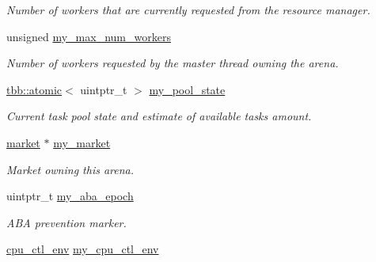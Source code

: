 \begin{DoxyCompactItemize}
\begin{DoxyCompactList}\small\item\em Number of workers that are currently requested from the resource manager. \end{DoxyCompactList}\item 
\hypertarget{structtbb_1_1internal_1_1arena__base_a87fa3017fe36fc2d82a59af27dbd80c2}{}unsigned \hyperlink{structtbb_1_1internal_1_1arena__base_a87fa3017fe36fc2d82a59af27dbd80c2}{my\+\_\+max\+\_\+num\+\_\+workers}\label{structtbb_1_1internal_1_1arena__base_a87fa3017fe36fc2d82a59af27dbd80c2}

\begin{DoxyCompactList}\small\item\em Number of workers requested by the master thread owning the arena. \end{DoxyCompactList}\item 
\hyperlink{structtbb_1_1atomic}{tbb\+::atomic}$<$ uintptr\+\_\+t $>$ \hyperlink{structtbb_1_1internal_1_1arena__base_a4a62e36b7d674c0023897118be16498d}{my\+\_\+pool\+\_\+state}
\begin{DoxyCompactList}\small\item\em Current task pool state and estimate of available tasks amount. \end{DoxyCompactList}\item 
\hypertarget{structtbb_1_1internal_1_1arena__base_a9571049272687e3f4d113809f0a62080}{}\hyperlink{classtbb_1_1internal_1_1market}{market} $\ast$ \hyperlink{structtbb_1_1internal_1_1arena__base_a9571049272687e3f4d113809f0a62080}{my\+\_\+market}\label{structtbb_1_1internal_1_1arena__base_a9571049272687e3f4d113809f0a62080}

\begin{DoxyCompactList}\small\item\em Market owning this arena. \end{DoxyCompactList}\item 
\hypertarget{structtbb_1_1internal_1_1arena__base_a296eec178d5cc622a8fa921d188dbc4f}{}uintptr\+\_\+t \hyperlink{structtbb_1_1internal_1_1arena__base_a296eec178d5cc622a8fa921d188dbc4f}{my\+\_\+aba\+\_\+epoch}\label{structtbb_1_1internal_1_1arena__base_a296eec178d5cc622a8fa921d188dbc4f}

\begin{DoxyCompactList}\small\item\em A\+B\+A prevention marker. \end{DoxyCompactList}\item 
\hypertarget{structtbb_1_1internal_1_1arena__base_ad3bceeb970e25673b1a1e60b67078062}{}\hyperlink{classtbb_1_1internal_1_1cpu__ctl__env}{cpu\+\_\+ctl\+\_\+env} \hyperlink{structtbb_1_1internal_1_1arena__base_ad3bceeb970e25673b1a1e60b67078062}{my\+\_\+cpu\+\_\+ctl\+\_\+env}\label{structtbb_1_1internal_1_1arena__base_ad3bceeb970e25673b1a1e60b67078062}


\end{DoxyCompactItemize}

